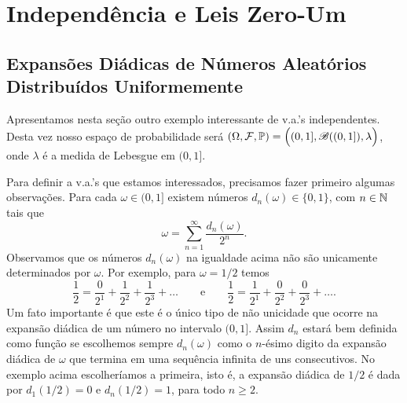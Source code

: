 \chapter[Aula 7]{Independência e Leis Zero-Um}
\chaptermark{}

\section{Expansões Diádicas de Números Aleatórios Distribuídos Uniformemente}

Apresentamos nesta seção outro exemplo interessante
de v.a.'s independentes. Desta vez nosso espaço 
de probabilidade será 
$(\Omega,\mathcal{F},\mathbb{P})=\Big((0,1],\mathscr{B}((0,1]),\lambda\Big)$,
onde $\lambda$ é a medida de Lebesgue em $(0,1]$.

Para definir a v.a.'s que estamos interessados,
precisamos fazer primeiro algumas observações. 
Para cada $\omega\in (0,1]$ existem
números $d_n(\omega)\in\{0,1\}$, com $n\in\mathbb{N}$  
tais que 
	\[
		\omega = \sum_{n=1}^{\infty} \frac{d_n(\omega)}{2^n}.
	\] 
Observamos que os números $d_n(\omega)$ na igualdade 
acima não são unicamente determinados por $\omega$. Por exemplo, 
para $\omega=1/2$ temos 
	\[
		\frac{1}{2} = \frac{0}{2^1}+\frac{1}{2^2}+\frac{1}{2^3}+\ldots
		\qquad
		\text{e}
		\qquad
		\frac{1}{2}= \frac{1}{2^1}+\frac{0}{2^2}+\frac{0}{2^3}+\ldots.
	\]  
Um fato importante é que este é o único tipo 
de não unicidade que ocorre na expansão diádica de um 
número no intervalo $(0,1]$. 
Assim $d_n$ estará
bem definida como função 
se escolhemos sempre $d_n(\omega)$ como 
o $n$-ésimo digito da expansão diádica de $\omega$ 
que termina em uma sequência infinita de uns consecutivos.
No exemplo acima escolheríamos a primeira, isto é,
a expansão diádica de $1/2$ é dada por $d_1(1/2)=0$ e
$d_n(1/2)=1$, para todo $n\geq 2$.


